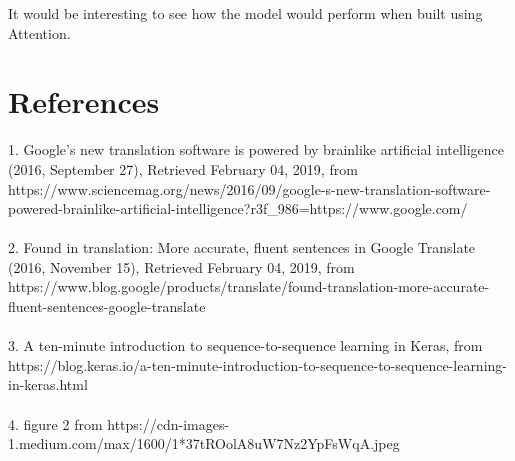 \documentclass{llncs}
\begin{document}
	It would be interesting to see how the model would perform when built using Attention.
	
	
	
	\section{References}
	1.	Google’s new translation software is powered by brainlike artificial intelligence (2016, September 27),  Retrieved February 04, 2019, from 
	https://www.sciencemag.org/news/2016/09/google-s-new-translation-software-powered-brainlike-artificial-intelligence?r3f\_986=https://www.google.com/
	\\
	\\
	2.	Found in translation: More accurate, fluent sentences in Google Translate (2016, November 15),  Retrieved February 04, 2019, from https://www.blog.google/products/translate/found-translation-more-accurate-fluent-sentences-google-translate
	\\
	\\
	3. A ten-minute introduction to sequence-to-sequence learning in Keras, from
	https://blog.keras.io/a-ten-minute-introduction-to-sequence-to-sequence-learning-in-keras.html
	\\
	\\
	4.  figure 2 from
	https://cdn-images-1.medium.com/max/1600/1*37tROolA8uW7Nz2YpFsWqA.jpeg
	\\
	\\

	
\end{document}
